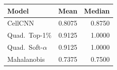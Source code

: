 \begin{tabular}{@{}lrr@{}}\toprule
Model & Mean & Median\\\midrule
CellCNN & 0.8075 & 0.8750\\
Quad.\ Top-1\% & 0.9125 & 1.0000\\
Quad.\ Soft-$\alpha$ & 0.9125 & 1.0000\\
Mahalanobis & 0.7375 & 0.7500\\
\bottomrule\end{tabular}
